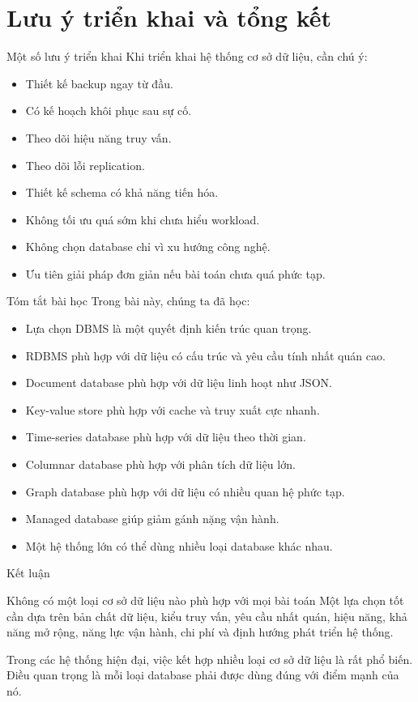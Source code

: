 \documentclass[aspectratio=169,11pt]{beamer}
\newcommand{\smallitem}{\setlength{\itemsep}{2pt}\setlength{\parskip}{0pt}}
\begin{document}
\section{Lưu ý triển khai và tổng kết}

\begin{frame}{Một số lưu ý triển khai}
Khi triển khai hệ thống cơ sở dữ liệu, cần chú ý:
\begin{itemize}
  \smallitem
  \item Thiết kế backup ngay từ đầu.
  \item Có kế hoạch khôi phục sau sự cố.
  \item Theo dõi hiệu năng truy vấn.
  \item Theo dõi lỗi replication.
  \item Thiết kế schema có khả năng tiến hóa.
  \item Không tối ưu quá sớm khi chưa hiểu workload.
  \item Không chọn database chỉ vì xu hướng công nghệ.
  \item Ưu tiên giải pháp đơn giản nếu bài toán chưa quá phức tạp.
\end{itemize}
\end{frame}

\begin{frame}{Tóm tắt bài học}
Trong bài này, chúng ta đã học:
\begin{itemize}
  \smallitem
  \item Lựa chọn DBMS là một quyết định kiến trúc quan trọng.
  \item RDBMS phù hợp với dữ liệu có cấu trúc và yêu cầu tính nhất quán cao.
  \item Document database phù hợp với dữ liệu linh hoạt như JSON.
  \item Key-value store phù hợp với cache và truy xuất cực nhanh.
  \item Time-series database phù hợp với dữ liệu theo thời gian.
  \item Columnar database phù hợp với phân tích dữ liệu lớn.
  \item Graph database phù hợp với dữ liệu có nhiều quan hệ phức tạp.
  \item Managed database giúp giảm gánh nặng vận hành.
  \item Một hệ thống lớn có thể dùng nhiều loại database khác nhau.
\end{itemize}
\end{frame}

\begin{frame}{Kết luận}
\begin{block}{Không có một loại cơ sở dữ liệu nào phù hợp với mọi bài toán}
Một lựa chọn tốt cần dựa trên bản chất dữ liệu, kiểu truy vấn, yêu cầu nhất quán, hiệu năng, khả năng mở rộng, năng lực vận hành, chi phí và định hướng phát triển hệ thống.
\end{block}

\vspace{2mm}
Trong các hệ thống hiện đại, việc kết hợp nhiều loại cơ sở dữ liệu là rất phổ biến. Điều quan trọng là mỗi loại database phải được dùng đúng với điểm mạnh của nó.
\end{frame}
\end{document}
